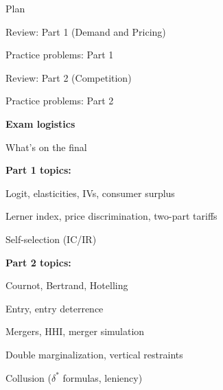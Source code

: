 \documentclass[notes,11pt, aspectratio=169]{beamer}
\newenvironment{wideitemize}{\itemize\addtolength{\itemsep}{10pt}}{\enditemize}
\newenvironment{wideenumerate}{\enumerate\addtolength{\itemsep}{10pt}}{\endenumerate}
\begin{document}

\begin{frame}{Plan}
  \begin{wideenumerate}
    \item Review: Part 1 (Demand and Pricing)
    \item Practice problems: Part 1
    \item Review: Part 2 (Competition)
    \item Practice problems: Part 2
    \item \textbf{Exam logistics}
  \end{wideenumerate}
\end{frame}

\begin{frame}{What's on the final}
	\begin{wideitemize}
		\item \textbf{Part 1 topics:}
		\begin{wideitemize}
			\vspace{3pt}
			\item Logit, elasticities, IVs, consumer surplus
			\item Lerner index, price discrimination, two-part tariffs
			\item Self-selection (IC/IR)
		\end{wideitemize}
		\item \textbf{Part 2 topics:}
		\begin{wideitemize}
			\vspace{3pt}
			\item Cournot, Bertrand, Hotelling
			\item Entry, entry deterrence
			\item Mergers, HHI, merger simulation
			\item Double marginalization, vertical restraints
			\item Collusion ($\delta^*$ formulas, leniency)
		\end{wideitemize}
	\end{wideitemize}
\end{frame}
\end{document}
